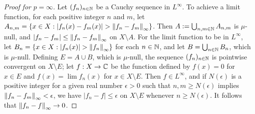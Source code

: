 \begin{proof}[Proof for $p=\infty$]
    Let $(f_n)_{n\in{\mathbb{N}}}$ be a Cauchy sequence in $L^\infty$.
    To achieve a limit function, for each positive integer $n$ and $m$, let $A_{n, m}=\{x\in X: |f_n(x)-f_m(x)|>\norm{f_n-f_m}_\infty\}$.
    Then $A:=\bigcup_{n, m\in{\mathbb{N}}} A_{n, m}$ is $\mu$-null, and $|f_n-f_m|\leq{\left\lVert{f_n-f_m}\right\rVert}_\infty$ on $X\setminus A$.
    For the limit function to be in $L^\infty$, let $B_n=\{x\in X: |f_n(x)|>\norm{f_n}_\infty\}$ for each $n\in{\mathbb{N}}$, and let $B=\bigcup_{n\in{\mathbb{N}}} B_n$, which is $\mu$-null.
    Defining $E=A\cup B$, which is $\mu$-null, the sequence $(f_n)_{n\in{\mathbb{N}}}$ is pointwise convergent on $X\setminus E$; let $f: X\rightarrow{\mathbb{C}}$ be the function defined by $f(x)=0$ for $x\in E$ and $f(x)=\lim f_n(x)$ for $x\in X\setminus E$.
    Then $f\in L^\infty$, and if $N(\epsilon)$ is a positive integer for a given real number $\epsilon>0$ such that $n, m\geq N(\epsilon)$ implies ${\left\lVert{f_n-f_m}\right\rVert}_\infty<\epsilon$, we have $|f_n-f|\leq\epsilon$ on $X\setminus E$ whenever $n\geq N(\epsilon)$.
    It follows that ${\left\lVert{f_n-f}\right\rVert}_\infty\rightarrow 0$.
\end{proof}